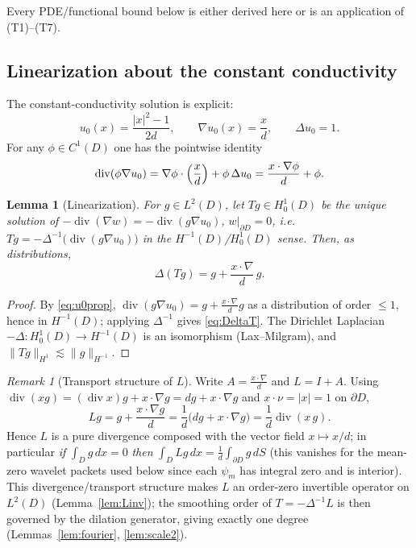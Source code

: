 \documentclass[11pt]{article}
\newtheorem{lemma}[theorem]{Lemma}
\theoremstyle{remark}
\newtheorem{remark}[theorem]{Remark}
\newcommand{\norm}[1]{\lVert #1\rVert}
\newcommand{\abs}[1]{\lvert #1\rvert}
\DeclareMathOperator{\diver}{div}
\begin{document}
\noindent Every PDE/functional bound below is either derived here or is an
application of (T1)--(T7).

\subsection{Linearization about the constant conductivity}
The constant-conductivity solution is explicit:
\[
u_{0}(x)=\frac{\abs{x}^{2}-1}{2d},
\qquad \nabla u_{0}(x)=\frac{x}{d},
\qquad \Delta u_{0}=1 .
\]
For any $\phi\in C^{1}(D)$ one has the pointwise identity
\begin{equation}\label{eq:u0prop}
\diver(\phi\nabla u_{0})
=\nabla\phi\cdot\Bigl(\frac{x}{d}\Bigr)+\phi\,\Delta u_{0}
=\frac{x\cdot\nabla\phi}{d}+\phi .
\end{equation}

\begin{lemma}[Linearization]\label{lem:lin}
For $g\in L^{2}(D)$, let $Tg\in H^{1}_{0}(D)$ be the unique solution of
$-\diver(\nabla w)=-\diver(g\nabla u_{0})$, $w|_{\partial D}=0$, i.e.\
$Tg=-\Delta^{-1}\!\bigl(\diver(g\nabla u_{0})\bigr)$ in the
$H^{-1}(D)$/$H^{1}_{0}(D)$ sense. Then, as distributions,
\begin{equation}\label{eq:DeltaT}
\Delta(Tg)=g+\frac{x\cdot\nabla}{d}\,g .
\end{equation}
\end{lemma}
\begin{proof}
By \eqref{eq:u0prop}, $\diver(g\nabla u_{0})=g+\frac{x\cdot\nabla}{d}g$
as a distribution of order $\le1$, hence in $H^{-1}(D)$; applying
$\Delta^{-1}$ gives \eqref{eq:DeltaT}. The Dirichlet Laplacian
$-\Delta:H^{1}_{0}(D)\to H^{-1}(D)$ is an isomorphism (Lax--Milgram), and
$\norm{Tg}_{H^{1}}\lesssim\norm{g}_{H^{-1}}$.
\end{proof}

\begin{remark}[Transport structure of $L$]\label{rem:meanzero}
Write $A=\frac{x\cdot\nabla}{d}$ and $L=I+A$. Using
$\diver(xg)=(\diver x)g+x\cdot\nabla g=dg+x\cdot\nabla g$ and
$x\cdot\nu=\abs{x}=1$ on $\partial D$,
\[
Lg=g+\frac{x\cdot\nabla g}{d}
=\frac1d\bigl(dg+x\cdot\nabla g\bigr)
=\frac1d\diver(x\,g).
\]
Hence $L$ is a pure divergence composed with the vector field $x\mapsto
x/d$; in particular \emph{if} $\int_D g\,dx=0$ \emph{then}
$\int_D Lg\,dx=\frac1d\int_{\partial D}g\,dS$ (this vanishes for the
mean-zero wavelet packets used below since each $\psi_m$ has integral zero
and is interior). This divergence/transport structure makes $L$ an
order-zero invertible operator on
$L^{2}(D)$ (Lemma~\ref{lem:Linv}); the smoothing order of $T=-\Delta^{-1}L$
is then governed by the dilation generator, giving exactly one degree
(Lemmas~\ref{lem:fourier}, \ref{lem:scale2}).
\end{remark}
\end{document}
